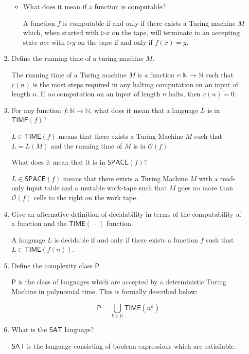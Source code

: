 \documentclass[10pt,\jkfside,a4paper]{article}
\begin{document}
\begin{enumerate}
\begin{itemize}
\item What does it mean if a function is computable?

A function $f$ is computable if and only if there exists a Turing machine
$M$ which, when started with $\triangleright x$ on the tape, will terminate
in an accepting state $acc$ with $\triangleright y$ on the tape if and only
if $f(x) = y$.

\end{itemize}

\item Define the running time of a turing machine $M$.

The running time of a Turing machine $M$ is a function $r: \mathbb N \to
\mathbb N$ such that $r(n)$ is the most steps required in any halting
computation on an input of length $n$. If \textit{no} computation on an
input of length $n$ halts, then $r(n) = 0$.

\item For any function $f: \mathbb N \to \mathbb N$, what does it mean that
a language $L$ is in $\mathsf{TIME}(f)$?

$L \in \mathsf{TIME}(f)$ means that there exists a Turing Machine $M$ such
that $L = L(M)$ and the running time of $M$ is in $\mathcal O(f)$.

What does it mean that it is in $\mathsf{SPACE}(f)$?

$L \in \mathsf{SPACE}(f)$ means that there exists a Turing Machine $M$ with
a read-only input table and a mutable work-tape such that $M$ goes no more
than $\mathcal O(f)$ cells to the right on the work tape.

\item Give an alternative definition of decidability in terms of the
computability of a function and the $\mathsf{TIME}(\ \cdot\ )$ function.

A language $L$ is decidable if and only if there exists a function $f$ such
that $L \in \mathsf{TIME}(f(n))$.

\item Define the complexity class $\mathsf{P}$

$\mathsf{P}$ is the class of languages which are accepted by a deterministic
Turing Machine in polynomial time. This is formally described below:

\[
\mathsf P = \bigcup_{k \in \mathbb N} \mathsf{TIME}(n^k)
\]

\item What is the $\mathsf{SAT}$ language?

$\mathsf{SAT}$ is the language consisting of boolean expressions which are
satisfiable.


\end{enumerate}
\end{document}
